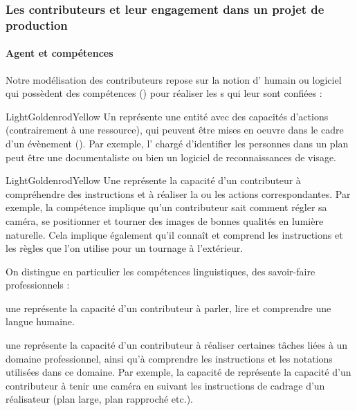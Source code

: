 \subsubsection{Les contributeurs et leur engagement dans un projet de production}\label{sec:agent}
\paragraph{Agent et compétences}
Notre modélisation des contributeurs repose sur la notion d' humain ou logiciel qui possèdent des compétences () pour réaliser les s qui leur sont confiées :
\begin{cadrecol}{LightGoldenrodYellow}
Un  représente une entité avec des capacités d'actions (contrairement à une ressource), qui peuvent être mises en oeuvre dans le cadre d'un évènement ().
Par exemple, l' chargé d'identifier les personnes dans un plan peut être une documentaliste ou bien un logiciel de reconnaissances de visage.
\end{cadrecol}

\begin{cadrecol}{LightGoldenrodYellow}
Une  représente la capacité d'un contributeur à compréhendre des instructions et à réaliser la ou les actions correspondantes.
Par exemple, la compétence  implique qu'un contributeur sait comment régler sa caméra, se positionner et tourner des images de bonnes qualités en lumière naturelle. 
Cela implique également qu'il connaît et comprend les instructions et les règles que l'on utilise pour un tournage à l'extérieur.
\end{cadrecol}

On distingue en particulier les compétences linguistiques, des savoir-faire professionnels : 
\begin{liste}
	\item une  représente la capacité d'un contributeur à parler, lire et comprendre une langue humaine.
	\item une  représente la capacité d'un contributeur à réaliser certaines tâches liées à un domaine professionnel, ainsi qu'à comprendre les instructions et les notations utilisées dans ce domaine. 
	Par exemple, la capacité de  représente la capacité d'un contributeur à tenir une caméra en suivant les instructions de cadrage d'un réalisateur (plan large, plan rapproché etc.).
\end{liste}

